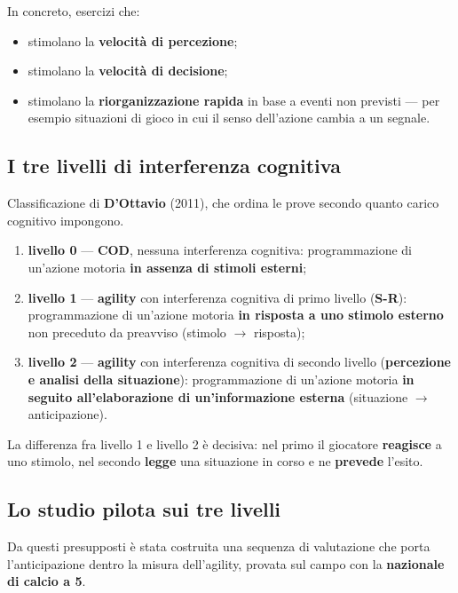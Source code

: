 In concreto, esercizi che:
\begin{itemize}
  \item stimolano la \textbf{velocità di percezione};
  \item stimolano la \textbf{velocità di decisione};
  \item stimolano la \textbf{riorganizzazione rapida} in base a eventi non previsti --- per
    esempio situazioni di gioco in cui il senso dell'azione cambia a un segnale.
\end{itemize}

\subsection{I tre livelli di interferenza cognitiva}

Classificazione di \textbf{D'Ottavio} (2011), che ordina le prove secondo quanto carico cognitivo
impongono.

\begin{enumerate}
  \item \textbf{livello 0} --- \textbf{COD}, nessuna interferenza cognitiva: programmazione di
    un'azione motoria \textbf{in assenza di stimoli esterni};
  \item \textbf{livello 1} --- \textbf{agility} con interferenza cognitiva di primo livello
    (\textbf{S-R}): programmazione di un'azione motoria \textbf{in risposta a uno stimolo esterno}
    non preceduto da preavviso (stimolo $\rightarrow$ risposta);
  \item \textbf{livello 2} --- \textbf{agility} con interferenza cognitiva di secondo livello
    (\textbf{percezione e analisi della situazione}): programmazione di un'azione motoria
    \textbf{in seguito all'elaborazione di un'informazione esterna} (situazione $\rightarrow$
    anticipazione).
\end{enumerate}

La differenza fra livello 1 e livello 2 è decisiva: nel primo il giocatore \textbf{reagisce} a uno
stimolo, nel secondo \textbf{legge} una situazione in corso e ne \textbf{prevede} l'esito.

\subsection{Lo studio pilota sui tre livelli}

Da questi presupposti è stata costruita una sequenza di valutazione che porta l'anticipazione
dentro la misura dell'agility, provata sul campo con la \textbf{nazionale di calcio a 5}.

